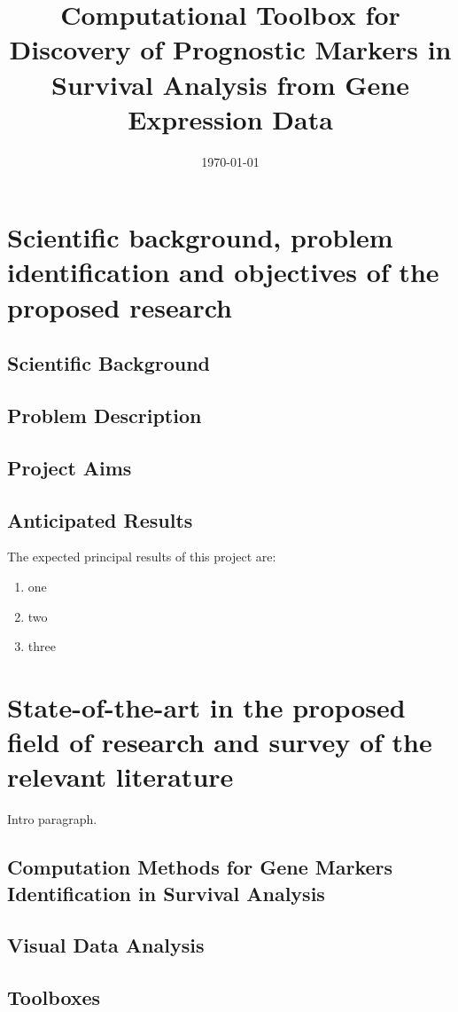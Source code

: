 \documentclass[11pt,a4paper]{article}
\begin{document}
\title{Computational Toolbox for Discovery of Prognostic Markers in Survival Analysis from Gene Expression Data}
\author{}
\date{\today}
\maketitle

\section{Scientific background, problem identification and objectives of the proposed research}
\subsection{Scientific Background}
\subsection{Problem Description}
\subsection{Project Aims}
\subsection{Anticipated Results}
The expected principal results of this project are:
\begin{enumerate}
	\item one
	\item two
	\item three
\end{enumerate}

\section{State-of-the-art in the proposed field of research and survey of the relevant literature}

Intro paragraph.

\subsection{Computation Methods for Gene Markers Identification in Survival Analysis}
\subsection{Visual Data Analysis}
\subsection{Toolboxes}
\end{document}

